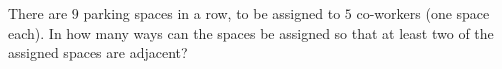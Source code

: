 There are $9$ parking spaces in a row, to be assigned to $5$ co-workers (one space each). In how many ways can the spaces be assigned so that at least two of the assigned spaces are adjacent?
